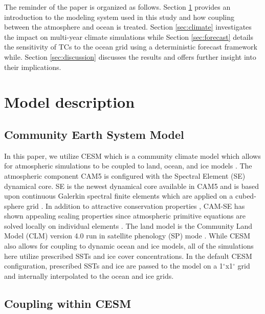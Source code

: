 \documentclass[draft,ms]{AGUTeX}
\newcommand{\degree}{$^{\circ}$}
\begin{document}
\begin{article}
The reminder of the paper is organized as follows. Section \ref{sec:model} provides an introduction to the modeling system used in this study and how coupling between the atmosphere and ocean is treated. Section \ref{sec:climate} investigates the impact on multi-year climate simulations while Section \ref{sec:forecast} details the sensitivity of TCs to the ocean grid using a deterministic forecast framework while. Section \ref{sec:discussion} discusses the results and offers further insight into their implications.


\section{Model description}
\label{sec:model}

\subsection{Community Earth System Model}
\label{subsec:cam}

In this paper, we utilize CESM which is a community climate model which allows for atmospheric simulations to be coupled to land, ocean, and ice models \citep{Hurrell2013CESM}. The atmospheric component CAM5 \citep{CAM5Tech} is configured with the Spectral Element (SE) dynamical core. SE is the newest dynamical core available in CAM5 and is based upon continuous Galerkin spectral finite elements which are applied on a cubed-sphere grid \citep{Taylor1997,Thomas2005,Taylor2010}. In addition to attractive conservation properties \citep{Taylor2011}, CAM-SE has shown appealing scaling properties since atmospheric primitive equations are solved locally on individual elements \citep{Dennis2012,Evans2013}. The land model is the Community Land Model (CLM) version 4.0 run in satellite phenology (SP) mode \citep{CLM40Tech}. While CESM also allows for coupling to dynamic ocean and ice models, all of the simulations here utilize prescribed SSTs and ice cover concentrations. In the default CESM configuration, prescribed SSTs and ice are passed to the model on a 1\degree{}x1\degree{} grid and internally interpolated to the ocean and ice grids.

\subsection{Coupling within CESM}
\label{subsec:coupling}


\end{article}
\end{document}
